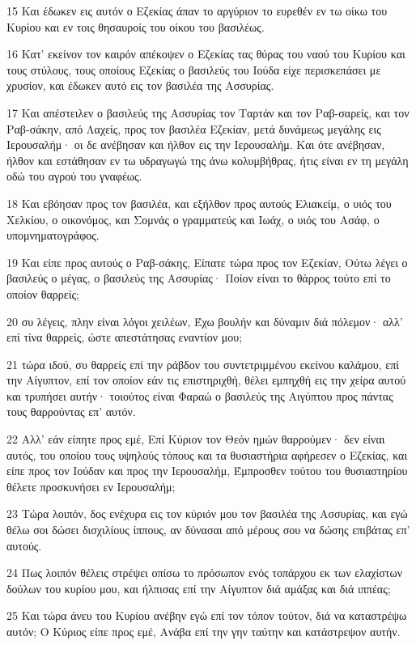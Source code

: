 \par 15 Και έδωκεν εις αυτόν ο Εζεκίας άπαν το αργύριον το ευρεθέν εν τω οίκω του Κυρίου και εν τοις θησαυροίς του οίκου του βασιλέως.
\par 16 Κατ' εκείνον τον καιρόν απέκοψεν ο Εζεκίας τας θύρας του ναού του Κυρίου και τους στύλους, τους οποίους Εζεκίας ο βασιλεύς του Ιούδα είχε περισκεπάσει με χρυσίον, και έδωκεν αυτό εις τον βασιλέα της Ασσυρίας.
\par 17 Και απέστειλεν ο βασιλεύς της Ασσυρίας τον Ταρτάν και τον Ραβ-σαρείς, και τον Ραβ-σάκην, από Λαχείς, προς τον βασιλέα Εζεκίαν, μετά δυνάμεως μεγάλης εις Ιερουσαλήμ· οι δε ανέβησαν και ήλθον εις την Ιερουσαλήμ. Και ότε ανέβησαν, ήλθον και εστάθησαν εν τω υδραγωγώ της άνω κολυμβήθρας, ήτις είναι εν τη μεγάλη οδώ του αγρού του γναφέως.
\par 18 Και εβόησαν προς τον βασιλέα, και εξήλθον προς αυτούς Ελιακείμ, ο υιός του Χελκίου, ο οικονόμος, και Σομνάς ο γραμματεύς και Ιωάχ, ο υιός του Ασάφ, ο υπομνηματογράφος.
\par 19 Και είπε προς αυτούς ο Ραβ-σάκης, Είπατε τώρα προς τον Εζεκίαν, Ούτω λέγει ο βασιλεύς ο μέγας, ο βασιλεύς της Ασσυρίας· Ποίον είναι το θάρρος τούτο επί το οποίον θαρρείς;
\par 20 συ λέγεις, πλην είναι λόγοι χειλέων, Έχω βουλήν και δύναμιν διά πόλεμον· αλλ' επί τίνα θαρρείς, ώστε απεστάτησας εναντίον μου;
\par 21 τώρα ιδού, συ θαρρείς επί την ράβδον του συντετριμμένου εκείνου καλάμου, επί την Αίγυπτον, επί τον οποίον εάν τις επιστηριχθή, θέλει εμπηχθή εις την χείρα αυτού και τρυπήσει αυτήν· τοιούτος είναι Φαραώ ο βασιλεύς της Αιγύπτου προς πάντας τους θαρρούντας επ' αυτόν.
\par 22 Αλλ' εάν είπητε προς εμέ, Επί Κύριον τον Θεόν ημών θαρρούμεν· δεν είναι αυτός, του οποίου τους υψηλούς τόπους και τα θυσιαστήρια αφήρεσεν ο Εζεκίας, και είπε προς τον Ιούδαν και προς την Ιερουσαλήμ, Έμπροσθεν τούτου του θυσιαστηρίου θέλετε προσκυνήσει εν Ιερουσαλήμ;
\par 23 Τώρα λοιπόν, δος ενέχυρα εις τον κύριόν μου τον βασιλέα της Ασσυρίας, και εγώ θέλω σοι δώσει δισχιλίους ίππους, αν δύνασαι από μέρους σου να δώσης επιβάτας επ' αυτούς.
\par 24 Πως λοιπόν θέλεις στρέψει οπίσω το πρόσωπον ενός τοπάρχου εκ των ελαχίστων δούλων του κυρίου μου, και ήλπισας επί την Αίγυπτον διά αμάξας και διά ιππέας;
\par 25 Και τώρα άνευ του Κυρίου ανέβην εγώ επί τον τόπον τούτον, διά να καταστρέψω αυτόν; Ο Κύριος είπε προς εμέ, Ανάβα επί την γην ταύτην και κατάστρεψον αυτήν.
